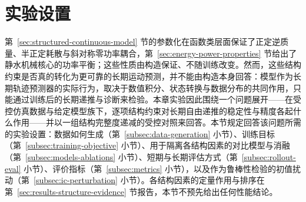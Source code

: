 
\section{实验设置}
\label{sec:training-baselines-protocol}

第~\ref{sec:structured-continuous-model} 节的参数化在函数类层面保证了正定逆质量、半正定耗散与斜对称零功率耦合，第~\ref{sec:energy-power-properties} 节给出了静水机械核心的功率平衡；这些性质由构造保证、不随训练改变。然而，这些结构约束是否真的转化为更可靠的长期运动预测，并不能由构造本身回答：模型作为长期轨迹预测器的实际行为，取决于数值积分、状态转换与数据分布的共同作用，只能通过训练后的长期递推与诊断来检验。本章实验因此围绕一个问题展开——在受控仿真数据与给定模型族下，逐项结构约束对长期自由递推的稳定性与精度各起什么作用——并以一组结构完整度递减的受控对照来回答。本节规定回答该问题所需的实验设置：数据如何生成（第~\ref{subsec:data-generation} 小节）、训练目标（第~\ref{subsec:training-objective} 小节）、用于隔离各结构因素的对比模型与消融（第~\ref{subsec:models-ablations} 小节）、短期与长期评估方式（第~\ref{subsec:rollout-eval} 小节）、评价指标（第~\ref{subsec:metrics} 小节），以及作为鲁棒性检验的初值扰动（第~\ref{subsec:ic-perturbation} 小节）。各结构因素的定量作用与排序在第~\ref{sec:results-structure-evidence} 节报告，本节不预先给出任何性能结论。


